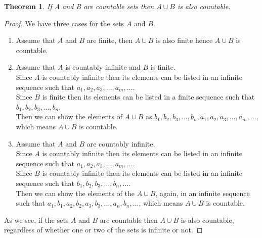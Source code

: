 \documentclass[12pt]{article}
\begin{document}
\begin{mdframed}

	\newtheorem{thm}{Theorem}

	\begin{thm}
	If A and B are countable sets then $A\cup B$ is also countable.
	\end{thm}

	\begin{proof}

	We have three cases for the sets $A$ and $B$.

		\begin{enumerate}[label=(\alph*)]

		\item Assume that $A$ and $B$ are finite, then $A\cup B$ is also finite hence $A\cup B$ is countable.

		\item Assume that $A$ is countably infinite and $B$ is finite.\\
	Since $A$ is countably infinite then its elements can be listed in an infinite sequence such that $a_1, a_2, a_3,\dots, a_m,\dots$.\\
	Since $B$ is finite then its elements can be listed in a finite sequence such that $b_1, b_2, b_3,\dots,b_n$.\\
	Then we can show the elements of $A\cup B$ as $b_1, b_2, b_3,\dots,b_n, a_1, a_2, a_3,\dots,a_m,\dots$, which means $A\cup B$ is countable.

		\item Assume that $A$ and $B$ are countably infinite.\\
	Since $A$ is countably infinite then its elements can be listed in an infinite sequence such that $a_1, a_2, a_3,\dots, a_m,\dots$.\\
	Since $B$ is countably infinite then its elements can be listed in an infinite sequence such that $b_1, b_2, b_3,\dots, b_n,\dots$.\\
	Then we can show the elements of the $A\cup B$, again, in an infinite sequence such that $a_1, b_1, a_2, b_2, a_3, b_3,\dots, a_n, b_n,\dots$, which means $A\cup B$ is countable.

		\end{enumerate}

	As we see, if the sets $A$ and $B$ are countable then $A\cup B$ is also countable, regardless of whether one or two of the sets is infinite or not. 

	\end{proof}

\end{mdframed}
\end{document}
